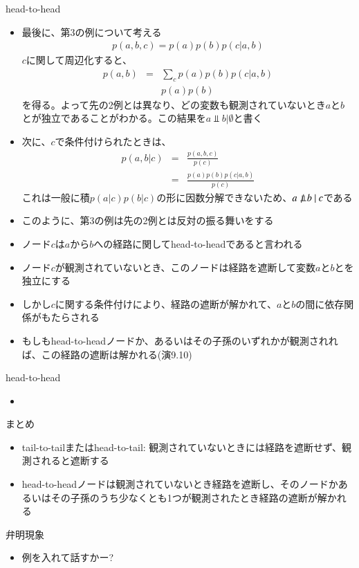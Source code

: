 \begin{frame}{head-to-head}
 \begin{itemize}
  \item 最後に、第3の例について考える
        \begin{eqnarray*}
         p(a,b,c) = p(a)p(b)p(c|a,b)
        \end{eqnarray*}
        $c$に関して周辺化すると、
        \begin{eqnarray*}
         p(a,b) &=& \sum_{c}p(a)p(b)p(c|a,b)\\
         & & p(a)p(b)
        \end{eqnarray*}
        を得る。よって先の2例とは異なり、どの変数も観測されていないとき$a$と$b$とが独立であることがわかる。この結果を$a \Perp b | \emptyset$と書く
  \item 次に、$c$で条件付けられたときは、
        \begin{eqnarray*}
         p(a,b|c) &=& \frac{p(a,b,c)}{p(c)}\\
         &= & \frac{p(a)p(b)p(c|a,b)}{p(c)}
        \end{eqnarray*}
        これは一般に積$p(a|c)p(b|c)$の形に因数分解できないため、$a \nPerp \ b \ | \ c$である
  \item このように、第3の例は先の2例とは反対の振る舞いをする
  \item ノード$c$は$a$から$b$への経路に関して\alert{head-to-head}であると言われる
  \item ノード$c$が観測されていないとき、このノードは経路を遮断して変数$a$と$b$とを独立にする
  \item しかし$c$に関する条件付けにより、経路の遮断が解かれて、$a$と$b$の間に依存関係がもたらされる
  \item もしもhead-to-headノードか、あるいはその子孫のいずれかが観測されれば、この経路の遮断は解かれる(演9.10)
 \end{itemize}
\end{frame}

\begin{frame}{head-to-head}
 \begin{itemize}
  \item
 \end{itemize}
\end{frame}

\begin{frame}{まとめ}
 \begin{itemize}
  \item tail-to-tailまたはhead-to-tail: 観測されていないときには経路を遮断せず、観測されると遮断する
  \item head-to-headノードは観測されていないとき経路を遮断し、そのノードかあるいはその子孫のうち少なくとも1つが観測されたとき経路の遮断が解かれる
 \end{itemize}
\end{frame}

\begin{frame}{弁明現象}
 \begin{itemize}
  \item 例を入れて話すかー?
 \end{itemize}
\end{frame}
